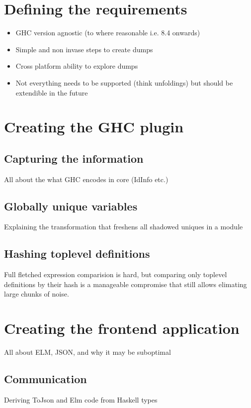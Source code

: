\documentclass{report}
\begin{document}
\section{Defining the requirements}

\begin{itemize}
  \item GHC version agnostic (to where reasonable i.e. 8.4 onwards)
  \item Simple and non invase steps to create dumps
  \item Cross platform ability to explore dumps
  \item Not everything needs to be supported (think unfoldings) but should be extendible in the future
\end{itemize}

\section{Creating the GHC plugin}

\subsection{Capturing the information}
All about the what GHC encodes in core (IdInfo etc.)

\subsection{Globally unique variables}
Explaining the transformation that freshens all shadowed uniques in a module

\subsection{Hashing toplevel definitions}
Full fletched expression comparision is hard, but comparing only toplevel definitions by their hash
is a manageable compromise that still allows elimating large chunks of noise.

\section{Creating the frontend application}
All about ELM, JSON, and why it may be suboptimal

\subsection{Communication}
Deriving ToJson and Elm code from Haskell types
\end{document}
